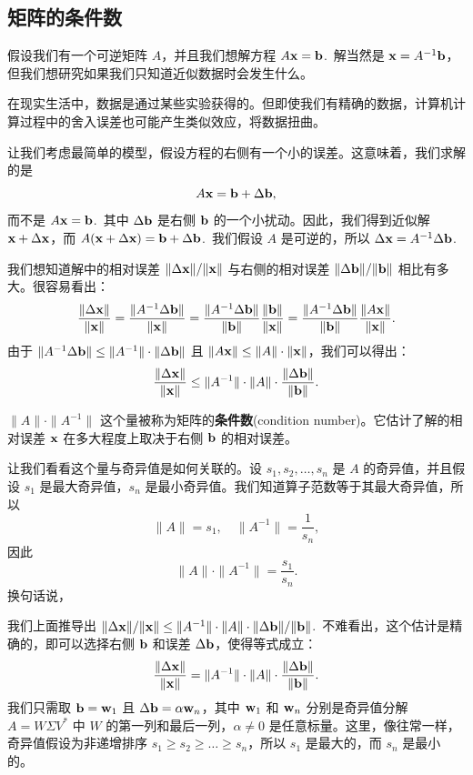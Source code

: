 \subsection{矩阵的条件数}\label{sec:06-04-03}

假设我们有一个可逆矩阵 $A$，并且我们想解方程 $A\mathbf{x} = \mathbf{b}$.~解当然是 $\mathbf{x} = A^{-1}\mathbf{b}$，但我们想研究如果我们只知道近似数据时会发生什么。

在现实生活中，数据是通过某些实验获得的。但即使我们有精确的数据，计算机计算过程中的舍入误差也可能产生类似效应，将数据扭曲。

让我们考虑最简单的模型，假设方程的右侧有一个小的误差。这意味着，我们求解的是 $$A\mathbf{x} = \mathbf{b} + \Delta \mathbf{b},$$
而不是 $A\mathbf{x} = \mathbf{b}$.~其中 $\Delta \mathbf{b}$ 是右侧 $\mathbf{b}$ 的一个小扰动。因此，我们得到近似解 $\mathbf{x} + \Delta \mathbf{x}$，而 $A(\mathbf{x} + \Delta \mathbf{x}) = \mathbf{b} + \Delta \mathbf{b}$.~我们假设 $A$ 是可逆的，所以 $\Delta \mathbf{x} = A^{-1} \Delta \mathbf{b}$.~

我们想知道解中的相对误差 $\|\Delta \mathbf{x}\| / \|\mathbf{x}\|$ 与右侧的相对误差 $\|\Delta \mathbf{b}\| / \|\mathbf{b}\|$ 相比有多大。很容易看出：
$$\frac{\|\Delta \mathbf{x}\|}{\|\mathbf{x}\|} = \frac{\|A^{-1} \Delta \mathbf{b}\|}{\|\mathbf{x}\|} = \frac{\|A^{-1} \Delta \mathbf{b}\|}{\|\mathbf{b}\|} \frac{\|\mathbf{b}\|}{\|\mathbf{x}\|} = \frac{\|A^{-1} \Delta \mathbf{b}\|}{\|\mathbf{b}\|} \frac{\|A\mathbf{x}\|}{\|\mathbf{x}\|}.$$
由于 $\|A^{-1} \Delta \mathbf{b}\| \le \|A^{-1}\| \cdot \|\Delta \mathbf{b}\|$ 且 $\|A\mathbf{x}\| \le \|A\| \cdot \|\mathbf{x}\|$，我们可以得出：
$$\frac{\|\Delta \mathbf{x}\|}{\|\mathbf{x}\|} \le \|A^{-1}\| \cdot \|A\| \cdot \frac{\|\Delta \mathbf{b}\|}{\|\mathbf{b}\|}.$$

$\|A\| \cdot \|A^{-1}\|$ 这个量被称为矩阵的\textbf{条件数}(condition number)。它估计了解的相对误差 $\mathbf{x}$ 在多大程度上取决于右侧 $\mathbf{b}$ 的相对误差。

让我们看看这个量与奇异值是如何关联的。设 $s_1, s_2, \dots, s_n$ 是 $A$ 的奇异值，并且假设 $s_1$ 是最大奇异值，$s_n$ 是最小奇异值。我们知道算子范数等于其最大奇异值，所以
$$\|A\| = s_1,\quad  \|A^{-1}\| = \frac{1}{s_n},$$
因此
$$\|A\| \cdot \|A^{-1}\| = \frac{s_1}{s_n}.$$
换句话说，


我们上面推导出 $\|\Delta \mathbf{x}\| / \|\mathbf{x}\| \le \|A^{-1}\| \cdot \|A\| \cdot \|\Delta \mathbf{b}\| / \|\mathbf{b}\|$.~不难看出，这个估计是精确的，即可以选择右侧 $\mathbf{b}$ 和误差 $\Delta \mathbf{b}$，使得等式成立：
$$\frac{\|\Delta \mathbf{x}\| } {\|\mathbf{x}\|} = \|A^{-1}\| \cdot \|A\| \cdot \frac{\|\Delta \mathbf{b}\| }{ \|\mathbf{b}\|}.$$
我们只需取 $\mathbf{b} = \mathbf{w}_1$ 且 $\Delta \mathbf{b} = \alpha \mathbf{w}_n$，其中 $\mathbf{w}_1$ 和 $\mathbf{w}_n$ 分别是奇异值分解 $A = W \Sigma V^*$ 中 $W$ 的第一列和最后一列，$\alpha \ne 0$ 是任意标量。这里，像往常一样，奇异值假设为非递增排序 $s_1 \ge s_2 \ge \dots \ge s_n$，所以 $s_1$ 是最大的，而 $s_n$ 是最小的。

